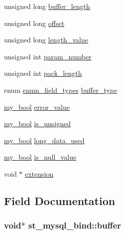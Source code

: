 \begin{DoxyCompactItemize}
unsigned long \hyperlink{structst__mysql__bind_a58fff187be9d3e492856a50f970b469f}{buffer\+\_\+length}
\item 
unsigned long \hyperlink{structst__mysql__bind_a5e786c095fb2f2c21167db2b08b2eb2a}{offset}
\item 
unsigned long \hyperlink{structst__mysql__bind_a3f78eab5d415489c5a0a6cb702974cf2}{length\+\_\+value}
\item 
unsigned int \hyperlink{structst__mysql__bind_a3d72263efdf64d9bf2eefe14588e35b3}{param\+\_\+number}
\item 
unsigned int \hyperlink{structst__mysql__bind_ae8961b4d8470d6e5b1b06d2c29e28170}{pack\+\_\+length}
\item 
enum \hyperlink{mysql__com_8h_a69e798807026a0f7e12b1d6c72374854}{enum\+\_\+field\+\_\+types} \hyperlink{structst__mysql__bind_ad3de66e824b46991edcc4ddbb3747ced}{buffer\+\_\+type}
\item 
\hyperlink{mysql_8h_a74cd599039dcf29c6e6d342cf4efd0a8}{my\+\_\+bool} \hyperlink{structst__mysql__bind_ac69cf2bf54564d646fbcf12c6981f18d}{error\+\_\+value}
\item 
\hyperlink{mysql_8h_a74cd599039dcf29c6e6d342cf4efd0a8}{my\+\_\+bool} \hyperlink{structst__mysql__bind_ae3a058be75cadc4f8219bbba9c322bad}{is\+\_\+unsigned}
\item 
\hyperlink{mysql_8h_a74cd599039dcf29c6e6d342cf4efd0a8}{my\+\_\+bool} \hyperlink{structst__mysql__bind_a31218c0f15b38ba638bcb302dcf50afb}{long\+\_\+data\+\_\+used}
\item 
\hyperlink{mysql_8h_a74cd599039dcf29c6e6d342cf4efd0a8}{my\+\_\+bool} \hyperlink{structst__mysql__bind_ae5b4c29062a979ed6039652301015a78}{is\+\_\+null\+\_\+value}
\item 
void $\ast$ \hyperlink{structst__mysql__bind_ac8e250bd8df7c1ff2921c3cb5c2ed564}{extension}
\end{DoxyCompactItemize}


\subsection{Field Documentation}
\hypertarget{structst__mysql__bind_a3ea4a5256c2e8c8f7b80ceea0ed5d3bb}{}
\subsubsection[{buffer}]{\setlength{\rightskip}{0pt plus 5cm}void$\ast$ st\+\_\+mysql\+\_\+bind\+::buffer}\label{structst__mysql__bind_a3ea4a5256c2e8c8f7b80ceea0ed5d3bb}
\hypertarget{structst__mysql__bind_a58fff187be9d3e492856a50f970b469f}{}
